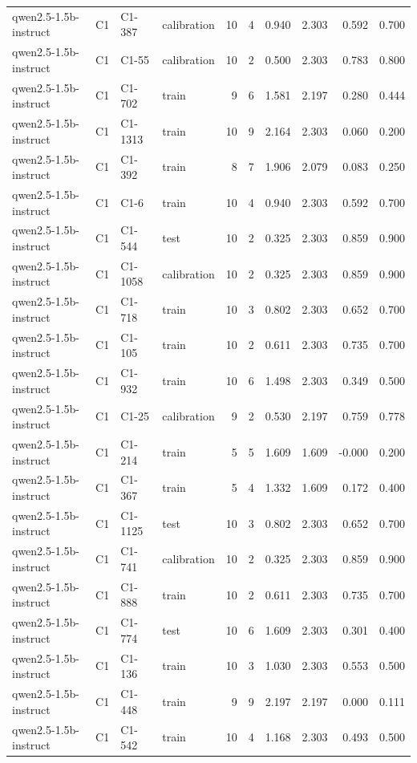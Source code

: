 \begin{table}
\begin{tabular}{llllrrrrrr}
qwen2.5-1.5b-instruct & C1 & C1-387 & calibration & 10 & 4 & 0.940 & 2.303 & 0.592 & 0.700 \\
qwen2.5-1.5b-instruct & C1 & C1-55 & calibration & 10 & 2 & 0.500 & 2.303 & 0.783 & 0.800 \\
qwen2.5-1.5b-instruct & C1 & C1-702 & train & 9 & 6 & 1.581 & 2.197 & 0.280 & 0.444 \\
qwen2.5-1.5b-instruct & C1 & C1-1313 & train & 10 & 9 & 2.164 & 2.303 & 0.060 & 0.200 \\
qwen2.5-1.5b-instruct & C1 & C1-392 & train & 8 & 7 & 1.906 & 2.079 & 0.083 & 0.250 \\
qwen2.5-1.5b-instruct & C1 & C1-6 & train & 10 & 4 & 0.940 & 2.303 & 0.592 & 0.700 \\
qwen2.5-1.5b-instruct & C1 & C1-544 & test & 10 & 2 & 0.325 & 2.303 & 0.859 & 0.900 \\
qwen2.5-1.5b-instruct & C1 & C1-1058 & calibration & 10 & 2 & 0.325 & 2.303 & 0.859 & 0.900 \\
qwen2.5-1.5b-instruct & C1 & C1-718 & train & 10 & 3 & 0.802 & 2.303 & 0.652 & 0.700 \\
qwen2.5-1.5b-instruct & C1 & C1-105 & train & 10 & 2 & 0.611 & 2.303 & 0.735 & 0.700 \\
qwen2.5-1.5b-instruct & C1 & C1-932 & train & 10 & 6 & 1.498 & 2.303 & 0.349 & 0.500 \\
qwen2.5-1.5b-instruct & C1 & C1-25 & calibration & 9 & 2 & 0.530 & 2.197 & 0.759 & 0.778 \\
qwen2.5-1.5b-instruct & C1 & C1-214 & train & 5 & 5 & 1.609 & 1.609 & -0.000 & 0.200 \\
qwen2.5-1.5b-instruct & C1 & C1-367 & train & 5 & 4 & 1.332 & 1.609 & 0.172 & 0.400 \\
qwen2.5-1.5b-instruct & C1 & C1-1125 & test & 10 & 3 & 0.802 & 2.303 & 0.652 & 0.700 \\
qwen2.5-1.5b-instruct & C1 & C1-741 & calibration & 10 & 2 & 0.325 & 2.303 & 0.859 & 0.900 \\
qwen2.5-1.5b-instruct & C1 & C1-888 & train & 10 & 2 & 0.611 & 2.303 & 0.735 & 0.700 \\
qwen2.5-1.5b-instruct & C1 & C1-774 & test & 10 & 6 & 1.609 & 2.303 & 0.301 & 0.400 \\
qwen2.5-1.5b-instruct & C1 & C1-136 & train & 10 & 3 & 1.030 & 2.303 & 0.553 & 0.500 \\
qwen2.5-1.5b-instruct & C1 & C1-448 & train & 9 & 9 & 2.197 & 2.197 & 0.000 & 0.111 \\
qwen2.5-1.5b-instruct & C1 & C1-542 & train & 10 & 4 & 1.168 & 2.303 & 0.493 & 0.500 \\

\end{tabular}
\end{table}
